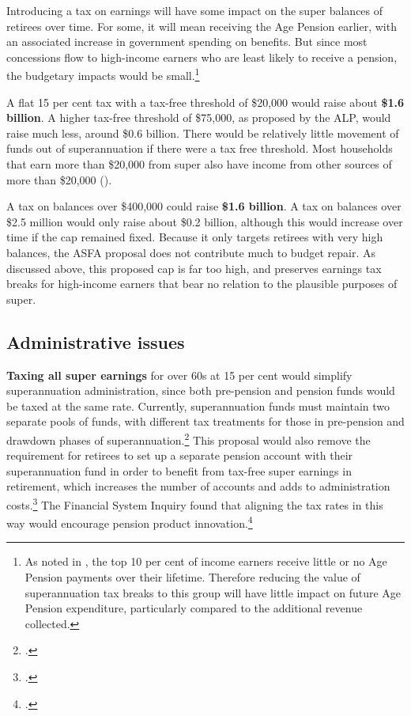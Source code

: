 Introducing a tax on earnings will have some impact on the super balances of retirees over time. For some, it will mean receiving the Age Pension earlier, with an associated increase in government spending on benefits. But since most concessions flow to high-income earners who are least likely to receive a pension, the budgetary impacts would be small.\footnote{As noted in , the top 10 per cent of income earners receive little or no Age Pension payments over their lifetime. Therefore reducing the value of superannuation tax breaks to this group will have little impact on future Age Pension expenditure, particularly compared to the additional revenue collected.} 

A flat 15 per cent tax with a tax-free threshold of \$20,000 would raise about \textbf{\$1.6 billion}. A higher tax-free threshold of \$75,000, as proposed by the ALP, would raise much less, around \$0.6 billion. There would be relatively little movement of funds out of superannuation if there were a tax free threshold. Most households that earn more than \$20,000 from super also have income from other sources of more than \$20,000 ().

A tax on balances over \$400,000 could raise \textbf{\$1.6 billion}.  A tax on balances over \$2.5 million would only raise about \$0.2 billion, although this would increase over time if the cap remained fixed. Because it only targets retirees with very high balances, the ASFA proposal does not contribute much to budget repair. As discussed above, this proposed cap is far too high, and preserves earnings tax breaks for high-income earners that bear no relation to the plausible purposes of super.

\subsection{Administrative issues}
\textbf{Taxing all super earnings} for over 60s at 15 per cent would simplify superannuation administration, since both pre-pension and pension funds would be taxed at the same rate. Currently, superannuation funds must maintain two separate pools of funds, with different tax treatments for those in pre-pension and drawdown phases of superannuation.\footcite[][44]{FinancialSystemsInquiry2015}  This proposal would also remove the requirement for retirees to set up a separate pension account with their superannuation fund in order to benefit from tax-free super earnings in retirement, which increases the number of accounts and adds to administration costs.\footcite{RiceWarner2015SubmissionTaxWhitePaper}  The Financial System Inquiry found that aligning the tax rates in this way would encourage pension product innovation.\footcite[][139]{FinancialSystemsInquiry2015} 

